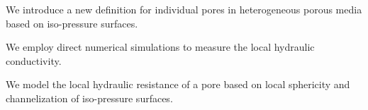 \documentclass[draft]{agujournal2019}
\begin{document}





\begin{keypoints}
\item We introduce a new definition for individual pores in heterogeneous porous media based on iso-pressure surfaces.
\item We employ direct numerical simulations to measure the local hydraulic conductivity. 
\item We model the local hydraulic resistance of a pore based on local sphericity and channelization of iso-pressure surfaces. 
\end{keypoints}

%
%

%
%
\end{document}

